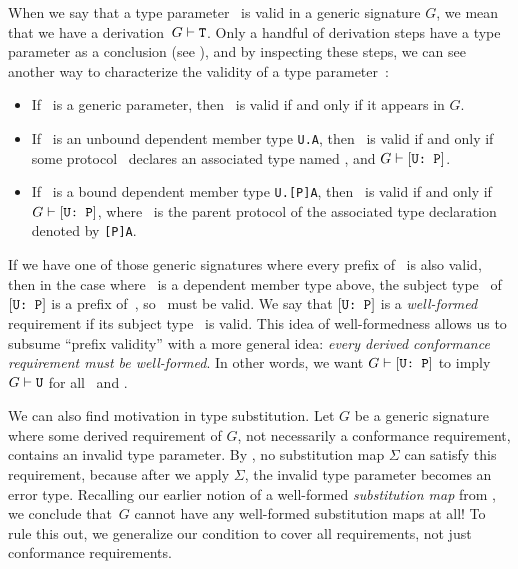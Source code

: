 \documentclass[../generics]{subfiles}
\begin{document}
When we say that a type parameter \tT\ is valid in a generic signature $G$, we mean that we have a derivation~$G\vdash\texttt{T}$. Only a handful of derivation steps have a type parameter as a conclusion (see ), and by inspecting these steps, we can see another way to characterize the validity of a type parameter~\tT:
\begin{itemize}
\item If \tT\ is a generic parameter, then \tT\ is valid if and only if it appears in $G$.
\item If \tT\ is an unbound dependent member type \texttt{U.A}, then \tT\ is valid if and only if some protocol \tP\ declares an associated type named \nA, and $G\vdash[\texttt{U:~P}]$.
\item If \tT\ is a bound dependent member type \texttt{U.[P]A}, then \tT\ is valid if and only if $G\vdash[\texttt{U:~P}]$, where \tP\ is the parent protocol of the associated type declaration denoted by \texttt{[P]A}.
\end{itemize}

If we have one of those generic signatures where every prefix of \tT\ is also valid, then in the case where \tT\ is a dependent member type above, the subject type \tU\ of $[\texttt{U:~P}]$ is a prefix of~\tT, so \tU\ must be valid. We say that $[\texttt{U:~P}]$ is a \emph{well-formed} requirement if its subject type \tU\ is valid. This idea of well-formedness allows us to subsume ``prefix validity'' with a more general idea: \textsl{every derived conformance requirement must be well-formed}. In other words, we want $G\vdash[\texttt{U:~P}]$ to imply $G\vdash\texttt{U}$ for all \tU\ and \tP.

We can also find motivation in type substitution. Let $G$ be a generic signature where some derived requirement of $G$, not necessarily a conformance requirement, contains an invalid type parameter. By , no substitution map $\Sigma$ can satisfy this requirement, because after we apply $\Sigma$, the invalid type parameter becomes an error type. Recalling our earlier notion of a well-formed \emph{substitution map} from , we conclude that~$G$ cannot have any well-formed substitution maps at all! To rule this out, we generalize our condition to cover all requirements, not just conformance requirements.
\end{document}

